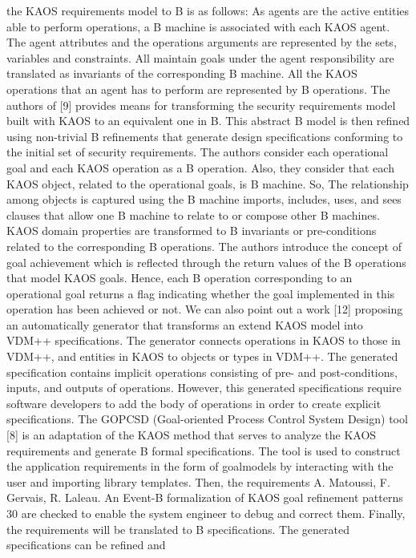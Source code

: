 the KAOS requirements model to B is as follows: As agents are the active entities able to
perform operations, a B machine is associated with each KAOS agent. The agent attributes
and the operations arguments are represented by the sets, variables and constraints. All
maintain goals under the agent responsibility are translated as invariants of the corresponding
B machine. All the KAOS operations that an agent has to perform are represented by B
operations.
The authors of [9] provides means for transforming the security requirements model built
with KAOS to an equivalent one in B. This abstract B model is then refined using non-trivial
B refinements that generate design specifications conforming to the initial set of security
requirements. The authors consider each operational goal and each KAOS operation as a B
operation. Also, they consider that each KAOS object, related to the operational goals, is
B machine. So, The relationship among objects is captured using the B machine imports,
includes, uses, and sees clauses that allow one B machine to relate to or compose other B machines. KAOS domain properties are transformed to B invariants or pre-conditions related to
the corresponding B operations. The authors introduce the concept of goal achievement which
is reflected through the return values of the B operations that model KAOS goals. Hence,
each B operation corresponding to an operational goal returns a flag indicating whether the
goal implemented in this operation has been achieved or not.
We can also point out a work [12] proposing an automatically generator that transforms
an extend KAOS model into VDM++ specifications. The generator connects operations in
KAOS to those in VDM++, and entities in KAOS to objects or types in VDM++. The
generated specification contains implicit operations consisting of pre- and post-conditions,
inputs, and outputs of operations. However, this generated specifications require software
developers to add the body of operations in order to create explicit specifications.
The GOPCSD (Goal-oriented Process Control System Design) tool [8] is an adaptation
of the KAOS method that serves to analyze the KAOS requirements and generate B formal
specifications. The tool is used to construct the application requirements in the form of goalmodels by interacting with the user and importing library templates. Then, the requirements
A. Matoussi, F. Gervais, R. Laleau. An Event-B formalization of KAOS goal refinement patterns 30
are checked to enable the system engineer to debug and correct them. Finally, the requirements will be translated to B specifications. The generated specifications can be refined and
